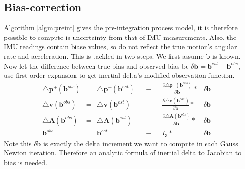 \documentclass[12pt]{article}   %
\begin{document}
\subsection{Bias-correction}
Algorithm \ref{algm:preint} gives the pre-integration process model, it is therefore possible to compute is uncertainty from that of IMU measurements. Also, the IMU readings contain biase values, so do not reflect the true motion's angular rate and acceleration. This is tackled in two steps. We first assume $\bm{b}$ is known. Now let the difference between true bias and observed bias be $\delta \bm{b} = \bm{b}^{est} - \bm{b}^{obs}$, use first order expansion to get inertial delta's modified observation function.
\begin{align}
\triangle \bm{p}^+(\bm{b}^{obs}) &=& \triangle \bm{p}^+(\bm{b}^{est})& &- & &\frac{\partial {\triangle \bm{p}^+(\bm{b}^{obs})}}{\partial \bm{b}}  *&\delta \bm{b} \\
\triangle \bm{v}(\bm{b}^{obs}) &=& \triangle \bm{v}(\bm{b}^{est})& &- & & \frac{\partial {\triangle \bm{v}(\bm{b}^{obs})}}{\partial \bm{b}}*& \delta \bm{b} \\
\triangle \bm{A}(\bm{b}^{obs}) &=& \triangle \bm{A}(\bm{b}^{est})& &- & &\frac{\partial {\triangle \bm{A}(\bm{b}^{obs})}}{\partial \bm{b}}*& \delta \bm{b} \\
\bm{b}^{obs} &=& \bm{b}^{est}& &- & & I_3*&\delta \bm{b}
\end{align}
Note this $\delta \bm{b}$ is exactly the delta increment we want to compute in each Gauss Newton iteration. Therefore an analytic formula of inertial delta to Jacobian to bias is needed.
\end{document}
